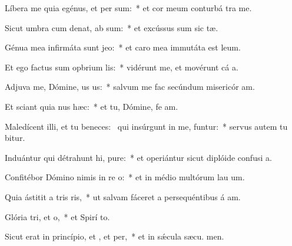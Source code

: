 \item Líbera me quia egénus, et per  sum:~* et cor meum conturbá  tra me.
\item Sicut umbra cum denat, ab sum:~* et excússus sum sic tæ.
\item Génua mea infirmáta sunt  jeo:~* et caro mea immutáta est  leum.
\item Et ego factus sum opbrium lis:~* vidérunt me, et movérunt cá a.
\item Adjuva me, Dómine, us us:~* salvum me fac secúndum misericór am.
\item Et sciant quia nus  hæc:~* et tu, Dómine, fe am.
\item Maledícent illi, et tu beneces:~\pscross{} qui insúrgunt in me, funtur:~* servus autem tu bitur.
\item Induántur qui détrahunt hi, pure:~* et operiántur sicut diplóide confusi a.
\item Confitébor Dómino nimis in re o:~* et in médio multórum lau um.
\item Quia ástitit a tris ris,~* ut salvam fáceret a persequéntibus á am.
\item Glória tri, et o,~* et Spirí to.
\item Sicut erat in princípio, et , et per,~* et in sǽcula sæcu. men.

